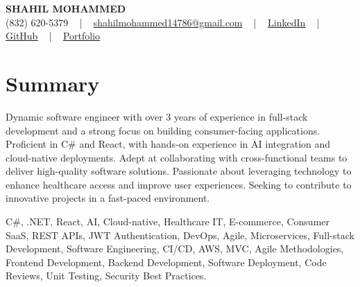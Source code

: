 \documentclass[letterpaper,10pt]{article}
\begin{document}
\begin{center}
    {\fontsize{14pt}{12pt}\selectfont \textbf{\MakeUppercase{Shahil Mohammed}}}\\ \vspace{2pt}
    \fontsize{10pt}{12pt}\selectfont (832) 620-5379 ~ | ~ \href{mailto:shahilmohammed14786@gmail.com}{shahilmohammed14786@gmail.com} ~ | ~  
    \href{https://www.linkedin.com/in/shahil-mohammed-9652931a1/}{\color{blue}\underline{LinkedIn}}  ~ | ~ 
    \href{https://github.com/freakbeast14}{\color{blue}\underline{GitHub}} ~ | ~ 
    \href{https://shahil-mohammed.netlify.app/}{\color{blue}\underline{Portfolio}}
    \vspace{-8pt}
\end{center}

\section{Summary}
\vspace{-2pt}\fontsize{8pt}{9pt}\selectfont
Dynamic software engineer with over 3 years of experience in full-stack development and a strong focus on building consumer-facing applications. Proficient in C# and React, with hands-on experience in AI integration and cloud-native deployments. Adept at collaborating with cross-functional teams to deliver high-quality software solutions. Passionate about leveraging technology to enhance healthcare access and improve user experiences. Seeking to contribute to innovative projects in a fast-paced environment.
 \vspace{-5pt}
 
{\fontsize{1pt}{1pt}\selectfont\color{white}
C#, .NET, React, AI, Cloud-native, Healthcare IT, E-commerce, Consumer SaaS, REST APIs, JWT Authentication, DevOps, Agile, Microservices, Full-stack Development, Software Engineering, CI/CD, AWS, MVC, Agile Methodologies, Frontend Development, Backend Development, Software Deployment, Code Reviews, Unit Testing, Security Best Practices.
}
\vspace{-8pt}

\vspace{-2pt}
\end{document}

